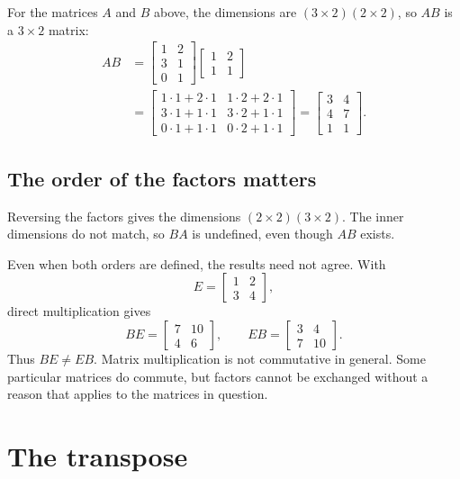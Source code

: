 For the matrices $A$ and $B$ above, the dimensions are
$(3\times2)(2\times2)$, so $AB$ is a $3\times2$ matrix:
\begin{align}
 AB
 &=\begin{bmatrix}1&2\\3&1\\0&1\end{bmatrix}
   \begin{bmatrix}1&2\\1&1\end{bmatrix}\\
 &=\begin{bmatrix}
  1\cdot1+2\cdot1 & 1\cdot2+2\cdot1\\
  3\cdot1+1\cdot1 & 3\cdot2+1\cdot1\\
  0\cdot1+1\cdot1 & 0\cdot2+1\cdot1
 \end{bmatrix}
 =\begin{bmatrix}3&4\\4&7\\1&1\end{bmatrix}.
 \label{eq:l01-AB}
\end{align}

\subsection{The order of the factors matters}
Reversing the factors gives the dimensions $(2\times2)(3\times2)$. The inner
dimensions do not match, so $BA$ is undefined, even though $AB$ exists.

Even when both orders are defined, the results need not agree. With
\[
 E=\begin{bmatrix}1&2\\3&4\end{bmatrix},
\]
direct multiplication gives
\[
 BE=\begin{bmatrix}7&10\\4&6\end{bmatrix},
 \qquad
 EB=\begin{bmatrix}3&4\\7&10\end{bmatrix}.
\]
Thus $BE\ne EB$. Matrix multiplication is not commutative in general. Some
particular matrices do commute, but factors cannot be exchanged without a
reason that applies to the matrices in question.

\section{The transpose}


